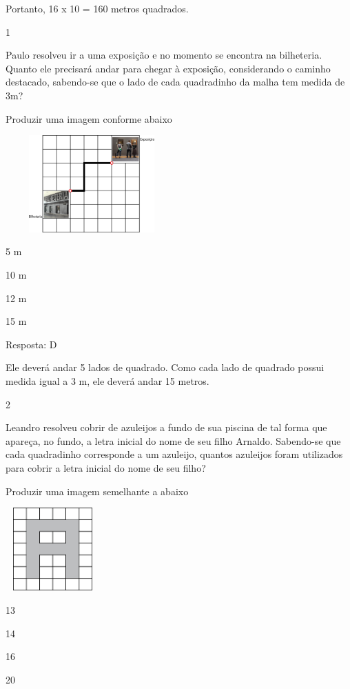 Portanto, 16 x 10 = 160 metros quadrados.


\num{1}

Paulo resolveu ir a uma exposição e no momento se encontra na
bilheteria. Quanto ele precisará andar para chegar à exposição,
considerando o caminho destacado, sabendo-se que o lado de cada
quadradinho da malha tem medida de 3m?

Produzir uma imagem conforme abaixo

\includegraphics[width=2.60897in,height=1.46587in]{media/image61.png}

\begin{escolha}
\item
  5 m
\item
  10 m
\item
  12 m
\item
  15 m
\end{escolha}

Resposta: D

Ele deverá andar 5 lados de quadrado. Como cada lado de quadrado possui
medida igual a 3 m, ele deverá andar 15 metros.

\num{2}

Leandro resolveu cobrir de azuleijos a fundo de sua piscina de tal forma
que apareça, no fundo, a letra inicial do nome de seu filho Arnaldo.
Sabendo-se que cada quadradinho corresponde a um azuleijo, quantos
azuleijos foram utilizados para cobrir a letra inicial do nome de seu
filho?

Produzir uma imagem semelhante a abaixo

\includegraphics[width=1.42949in,height=1.25160in]{media/image62.png}

\begin{escolha}
\item
  13
\item
  14
\item
  16
\item
  20
\end{escolha}

